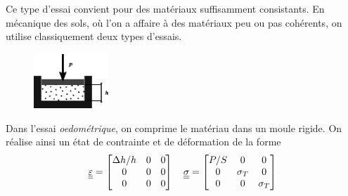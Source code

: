 Ce type d'essai convient pour des matériaux suffisamment consistants.
En mécanique des sols, où l'on a affaire à des matériaux peu ou pas cohérents, on utilise classiquement deux types d'essais.

\begin{figure}
    \begin{center}
        \includegraphics[width=2.8cm]{../images/T1_Ch04-0009}
    \end{center}
\end{figure}
Dans l'essai \emph{oedométrique}, on comprime le matériau dans un moule rigide.
On réalise ainsi un état de contrainte et de déformation de la forme
\begin{equation}
    \underline{\underline{\varepsilon}} =
    \begin{bmatrix}
        \Delta h/h & 0 & 0 \\
        0 & 0 & 0 \\
        0 & 0 & 0
    \end{bmatrix}
    \quad
    \underline{\underline{\sigma}} = 
    \begin{bmatrix}
        P/S & 0 & 0 \\
        0 & \sigma_T & 0 \\
        0 & 0 & \sigma_T
    \end{bmatrix}
    \label{eq:Ch04-037}
\end{equation}

